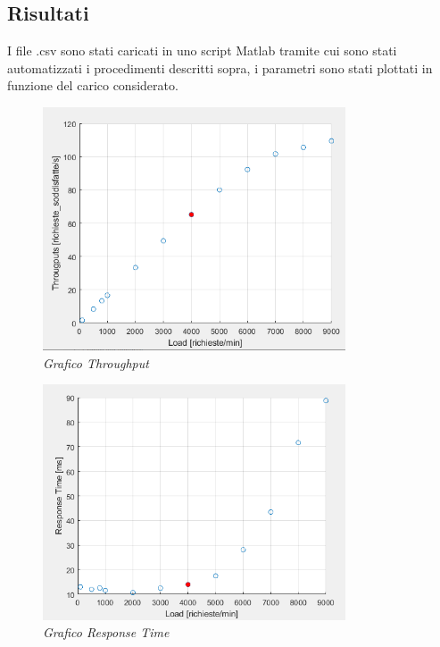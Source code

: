 \subsection{Risultati}
I file .csv sono stati caricati in uno script Matlab tramite cui sono stati automatizzati i procedimenti descritti sopra, i parametri sono stati plottati in funzione del carico considerato.
\\
\begin{figure}[H]
	\centering
	\includegraphics[width=0.8\textwidth]{img/hw2/Throughput.png}
	\caption{\textit{Grafico Throughput}}
\end{figure}

\begin{figure}[H]
	\centering
	\includegraphics[width=0.8\textwidth]{img/hw2/ResponseTime.png}
	\caption{\textit{Grafico Response Time}}
\end{figure}

